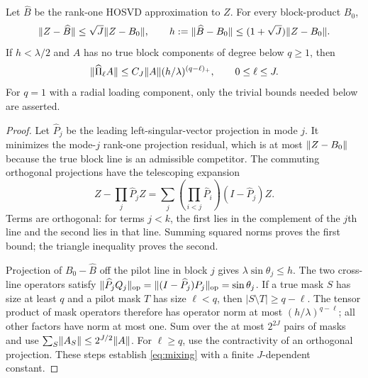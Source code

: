 \begin{lemma}\label{lem:pilot}
Let $\widehat B$ be the rank-one HOSVD approximation to $Z$. For every block-product $B_0$,
\[
 \lVert Z-\widehat B\rVert\le\sqrt J\lVert Z-B_0\rVert,\qquad
 h:=\lVert \widehat B-B_0\rVert\le(1+\sqrt J)\lVert Z-B_0\rVert.
\]
If $h<\lambda/2$ and $A$ has no true block components of degree below $q\ge1$, then
\begin{equation}\label{eq:mixing}
 \lVert \widehat\Pi_\ell A\rVert\le C_J\lVert A\rVert
 (h/\lambda)^{(q-\ell)_+},\qquad 0\le\ell\le J.
\end{equation}
For $q=1$ with a radial loading component, only the trivial bounds needed below are asserted.
\end{lemma}
\begin{proof}
Let $\widehat P_j$ be the leading left-singular-vector projection in mode $j$. It minimizes the mode-$j$ rank-one projection residual, which is at most $\lVert Z-B_0\rVert$ because the true block line is an admissible competitor. The commuting orthogonal projections have the telescoping expansion
\[
 Z-\prod_j\widehat P_j Z
 =\sum_j\left(\prod_{i<j}\widehat P_i\right)(I-\widehat P_j)Z.
\]
Terms are orthogonal: for terms $j<k$, the first lies in the complement of the $j$th line and the second lies in that line. Summing squared norms proves the first bound; the triangle inequality proves the second.

Projection of $B_0-\widehat B$ off the pilot line in block $j$ gives $\lambda\sin\theta_j\le h$. The two cross-line operators satisfy $\lVert \widehat P_jQ_j\rVert_{\rm op}=\lVert (I-\widehat P_j)P_j\rVert_{\rm op}=\sin\theta_j$. If a true mask $S$ has size at least $q$ and a pilot mask $T$ has size $\ell<q$, then $|S\setminus T|\ge q-\ell$. The tensor product of mask operators therefore has operator norm at most $(h/\lambda)^{q-\ell}$; all other factors have norm at most one. Sum over the at most $2^{2J}$ pairs of masks and use $\sum_S\lVert A_S\rVert\le2^{J/2}\lVert A\rVert$. For $\ell\ge q$, use the contractivity of an orthogonal projection. These steps establish \eqref{eq:mixing} with a finite $J$-dependent constant.
\end{proof}

